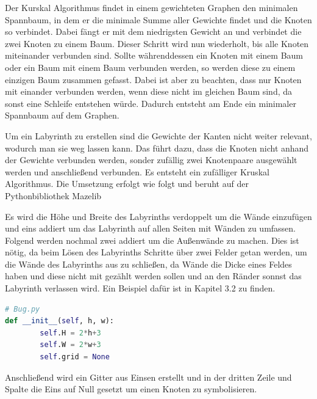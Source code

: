 \documentclass[12pt, a4paper, titlepage]{article}
\begin{document}
\bigskip

Der Kurskal Algorithmus findet in einem gewichteten Graphen den minimalen Spannbaum, in dem er die minimale Summe aller Gewichte findet und die Knoten so verbindet. 
Dabei fängt er mit dem niedrigsten Gewicht an und verbindet die zwei Knoten zu einem Baum.
Dieser Schritt wird nun wiederholt, bis alle Knoten miteinander verbunden sind.
Sollte währenddessen ein Knoten mit einem Baum oder ein Baum mit einem Baum verbunden werden, so werden diese zu einem einzigen Baum zusammen gefasst.
Dabei ist aber zu beachten, dass nur Knoten mit einander verbunden werden, wenn diese nicht im gleichen Baum sind, da sonst eine Schleife entstehen würde.
Dadurch entsteht am Ende ein minimaler Spannbaum auf dem Graphen.
 

\bigskip

Um ein Labyrinth zu erstellen sind die Gewichte der Kanten nicht weiter relevant, wodurch man sie weg lassen kann.
Das führt dazu, dass die Knoten nicht anhand der Gewichte verbunden werden, sonder zufällig zwei Knotenpaare ausgewählt werden und anschließend verbunden.
Es entsteht ein zufälliger Kruskal Algorithmus.
Die Umsetzung erfolgt wie folgt und beruht auf der Pythonbibliothek Mazelib \cite{mazelib}


Es wird die Höhe und Breite des Labyrinths verdoppelt um die Wände einzufügen und eins addiert um das Labyrinth auf allen Seiten mit Wänden zu umfassen.
Folgend werden nochmal zwei addiert um die Außenwände  zu machen. Dies ist nötig, da beim Lösen des Labyrinths Schritte über zwei Felder getan werden, um die Wände des Labyrinths aus zu schließen, da Wände die Dicke eines Feldes haben und diese nicht mit gezählt werden sollen und an den Ränder sonnst das Labyrinth verlassen wird. Ein Beispiel dafür ist in Kapitel 3.2 zu finden.

\begin{lstlisting}[language = Python]
# Bug.py
def __init__(self, h, w):
        self.H = 2*h+3
        self.W = 2*w+3
        self.grid = None
\end{lstlisting}

Anschließend wird ein Gitter aus Einsen erstellt und in der dritten Zeile und Spalte die Eins auf Null gesetzt um einen Knoten zu symbolisieren.
\end{document}
